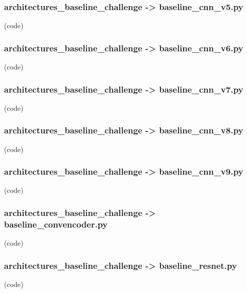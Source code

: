 \begin{myparindent}{0pt}
\noindent\subsubsection[baseline\_cnn\_v5.py]{architectures\_baseline\_challenge -> baseline\_cnn\_v5.py} (code)

\noindent\subsubsection[baseline\_cnn\_v6.py]{architectures\_baseline\_challenge -> baseline\_cnn\_v6.py} (code)

\noindent\subsubsection[baseline\_cnn\_v7.py]{architectures\_baseline\_challenge -> baseline\_cnn\_v7.py} (code)

\noindent\subsubsection[baseline\_cnn\_v8.py]{architectures\_baseline\_challenge -> baseline\_cnn\_v8.py} (code)

\noindent\subsubsection[baseline\_cnn\_v9.py]{architectures\_baseline\_challenge -> baseline\_cnn\_v9.py} (code)

\noindent\subsubsection[baseline\_convencoder.py]{architectures\_baseline\_challenge -> baseline\_convencoder.py} (code)

\noindent\subsubsection[baseline\_resnet.py]{architectures\_baseline\_challenge -> baseline\_resnet.py} (code)

\end{myparindent}

